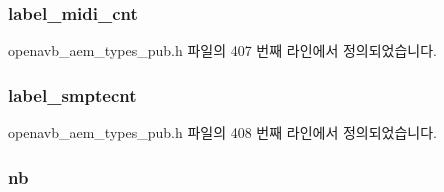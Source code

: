 \subsubsection[{\texorpdfstring{label\+\_\+midi\+\_\+cnt}{label_midi_cnt}}]{ label\+\_\+midi\+\_\+cnt}\hypertarget{structopenavb__aem__stream__format__iec__61883__6__am824__t_a4628633faf4a572fcbb7fe06423b8dd1}{}\label{structopenavb__aem__stream__format__iec__61883__6__am824__t_a4628633faf4a572fcbb7fe06423b8dd1}


openavb\+\_\+aem\+\_\+types\+\_\+pub.\+h 파일의 407 번째 라인에서 정의되었습니다.

\subsubsection[{\texorpdfstring{label\+\_\+smptecnt}{label_smptecnt}}]{ label\+\_\+smptecnt}\hypertarget{structopenavb__aem__stream__format__iec__61883__6__am824__t_a640623d58171c7f0ad91146a7782ec50}{}\label{structopenavb__aem__stream__format__iec__61883__6__am824__t_a640623d58171c7f0ad91146a7782ec50}


openavb\+\_\+aem\+\_\+types\+\_\+pub.\+h 파일의 408 번째 라인에서 정의되었습니다.

\subsubsection[{\texorpdfstring{nb}{nb}}]{ nb}\hypertarget{structopenavb__aem__stream__format__iec__61883__6__am824__t_a023f12d5e389074b0205b2ff18a0db54}{}\label{structopenavb__aem__stream__format__iec__61883__6__am824__t_a023f12d5e389074b0205b2ff18a0db54}



